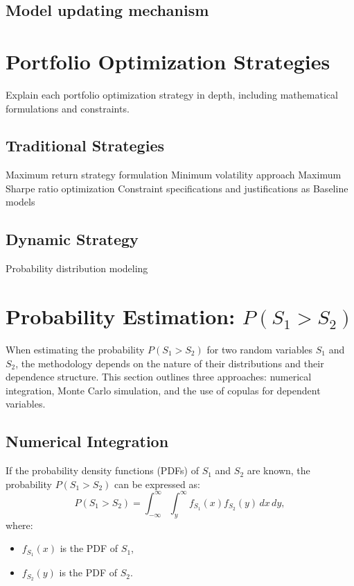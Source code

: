 \subsection{Model updating mechanism}

\section{Portfolio Optimization Strategies}
Explain each portfolio optimization strategy in depth, including mathematical formulations and constraints.
\subsection{Traditional Strategies}
Maximum return strategy formulation
Minimum volatility approach
Maximum Sharpe ratio optimization
Constraint specifications and justifications as Baseline models
\subsection{Dynamic Strategy}
Probability distribution modeling

\section{Probability Estimation: $P(S_1 > S_2)$}

When estimating the probability $P(S_1 > S_2)$ for two random variables $S_1$ and $S_2$, the methodology depends on the nature of their distributions and their dependence structure. This section outlines three approaches: numerical integration, Monte Carlo simulation, and the use of copulas for dependent variables.

\subsection{Numerical Integration}

If the probability density functions (PDFs) of $S_1$ and $S_2$ are known, the probability $P(S_1 > S_2)$ can be expressed as:
\begin{equation}
P(S_1 > S_2) = \int_{-\infty}^\infty \int_{y}^\infty f_{S_1}(x) f_{S_2}(y) \, dx \, dy,
\end{equation}
where:
\begin{itemize}
    \item $f_{S_1}(x)$ is the PDF of $S_1$,
    \item $f_{S_2}(y)$ is the PDF of $S_2$.
\end{itemize}

